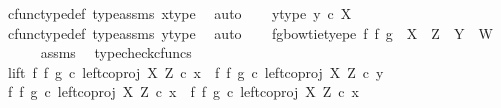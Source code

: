 \begin{isabellebody}
\ cfunc{\isacharunderscore}{\kern0pt}type{\isacharunderscore}{\kern0pt}def\ type{\isacharunderscore}{\kern0pt}assms{\isacharparenleft}{\kern0pt}{}{\isacharparenright}{\kern0pt}\ x{\isacharunderscore}{\kern0pt}type\ \isamarkupfalse%
\ auto\isanewline
\ \ \isamarkupfalse%
\ y{\isacharunderscore}{\kern0pt}type{}{\isacharcolon}{\kern0pt}\ {\isachardoublequoteopen}y\ {\isasymin}\isactrlsub c\ X{\isachardoublequoteclose}\isanewline
\ \ \ \ \isamarkupfalse%
\ cfunc{\isacharunderscore}{\kern0pt}type{\isacharunderscore}{\kern0pt}def\ type{\isacharunderscore}{\kern0pt}assms{\isacharparenleft}{\kern0pt}{}{\isacharparenright}{\kern0pt}\ y{\isacharunderscore}{\kern0pt}type\ \isamarkupfalse%
\ auto\isanewline
\ \ \isamarkupfalse%
\ fg{\isacharunderscore}{\kern0pt}bowtie{\isacharunderscore}{\kern0pt}tyepe{\isacharcolon}{\kern0pt}\ {\isachardoublequoteopen}{\isacharparenleft}{\kern0pt}f\ {\isasymbowtie}\isactrlsub f\ g{\isacharparenright}{\kern0pt}\ {\isacharcolon}{\kern0pt}\ X\ {\isasymCoprod}\ Z\ {\isasymrightarrow}\ Y\ {\isasymCoprod}\ W{\isachardoublequoteclose}\isanewline
\ \ \ \ \isamarkupfalse%
\ assms\ \isamarkupfalse%
\ typecheck{\isacharunderscore}{\kern0pt}cfuncs\isanewline
\ \ \isamarkupfalse%
\ lift{\isacharcolon}{\kern0pt}\ {\isachardoublequoteopen}{\isacharparenleft}{\kern0pt}f\ {\isasymbowtie}\isactrlsub f\ g{\isacharparenright}{\kern0pt}\ {\isasymcirc}\isactrlsub c\ left{\isacharunderscore}{\kern0pt}coproj\ X\ Z\ {\isasymcirc}\isactrlsub c\ x\ {\isacharequal}{\kern0pt}\ {\isacharparenleft}{\kern0pt}f\ {\isasymbowtie}\isactrlsub f\ g{\isacharparenright}{\kern0pt}\ {\isasymcirc}\isactrlsub c\ left{\isacharunderscore}{\kern0pt}coproj\ X\ Z\ {\isasymcirc}\isactrlsub c\ y{\isachardoublequoteclose}\isanewline
\ \ \isamarkupfalse%
\ {\isacharminus}{\kern0pt}\ \isanewline
\ \ \ \ \isamarkupfalse%
\ {\isachardoublequoteopen}{\isacharparenleft}{\kern0pt}f\ {\isasymbowtie}\isactrlsub f\ g{\isacharparenright}{\kern0pt}\ {\isasymcirc}\isactrlsub c\ left{\isacharunderscore}{\kern0pt}coproj\ X\ Z\ {\isasymcirc}\isactrlsub c\ x\ {\isacharequal}{\kern0pt}\ {\isacharparenleft}{\kern0pt}{\isacharparenleft}{\kern0pt}f\ {\isasymbowtie}\isactrlsub f\ g{\isacharparenright}{\kern0pt}\ {\isasymcirc}\isactrlsub c\ left{\isacharunderscore}{\kern0pt}coproj\ X\ Z{\isacharparenright}{\kern0pt}\ {\isasymcirc}\isactrlsub c\ x{\isachardoublequoteclose}\isanewline
\ \ \ \ \ \ \isamarkupfalse%

\end{isabellebody}

